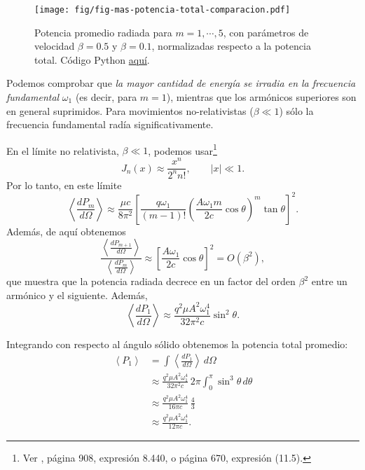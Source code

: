 \begin{figure}[ht]
\centerline{\texttt{[image: fig/fig-mas-potencia-total-comparacion.pdf]}}
 \caption{Potencia promedio radiada para $m=1,\cdots,5$, con parámetros de velocidad $\beta=0.5$ y  $\beta=0.1$, normalizadas respecto a la potencia total.  Código Python \href{https://github.com/gfrubi/electrodinamica/blob/master/figuras-editables/fig-mas-potencia-total-comparacion.py}{aquí}.}
\label{TER3}
\end{figure}
Podemos comprobar que \textit{la mayor cantidad de energía se irradia en la
frecuencia fundamental} $\omega_1$ (es decir, para $m=1$), mientras que los
armónicos superiores son en general suprimidos. Para movimientos
no-relativistas ($\beta\ll 1$) sólo la frecuencia fundamental radía
significativamente.

 En el límite no relativista, $\beta\ll 1$, podemos usar\footnote{Ver \cite{GR00}, página 908, expresión 8.440, o \cite{AW01} página 670, expresión (11.5).}
\begin{equation*}
J_{n}(x)\approx \frac{x^n}{2^nn!}, \qquad |x|\ll 1.
\end{equation*}
Por lo tanto, en este límite
\begin{equation}
\left\langle \frac{dP_{m}}{d\Omega}\right\rangle
\approx  \frac{\mu c}{8\pi^2}\left[\frac{q\omega_1}{(m-1)!}\left(\frac{A\omega_1m}{2c}\cos\theta\right)^{m}\tan\theta\right]^2.
\end{equation}
Además, de aquí obtenemos
\begin{equation}
\frac{\left\langle \frac{dP_{m+1}}{d\Omega}\right\rangle}{\left\langle \frac{dP_{m}}{d\Omega}\right\rangle}\approx \left[\frac{A\omega_1}{2c}\cos\theta\right]^2=O(\beta^2),
\end{equation}
que muestra que la potencia radiada decrece en un factor del orden $\beta^2$ entre un armónico y el siguiente. Además,
\begin{equation}
\left\langle \frac{dP_{1}}{d\Omega}\right\rangle
\approx  \frac{q^2\mu A^2\omega_1^4}{32\pi^2 c}\sin^2\theta.
\end{equation}

 Integrando con respecto al ángulo sólido obtenemos la potencia total promedio:
\begin{align}
\left\langle P_{1}\right\rangle &= \int \left\langle\frac{dP_{1}}{d\Omega}\right\rangle\,d\Omega\\
&\approx \frac{q^2\mu A^2\omega_1^4}{32\pi^2c}\,2\pi\int_{0}^{\pi
}\sin ^{3}\theta\, d\theta   \\
&\approx \frac{q^2\mu A^2\omega_1^4}{16\pi c}\,\frac{4}{3}  \\
&\approx \frac{q^2\mu A^2\omega_1^4}{12\pi c}.
\end{align}

